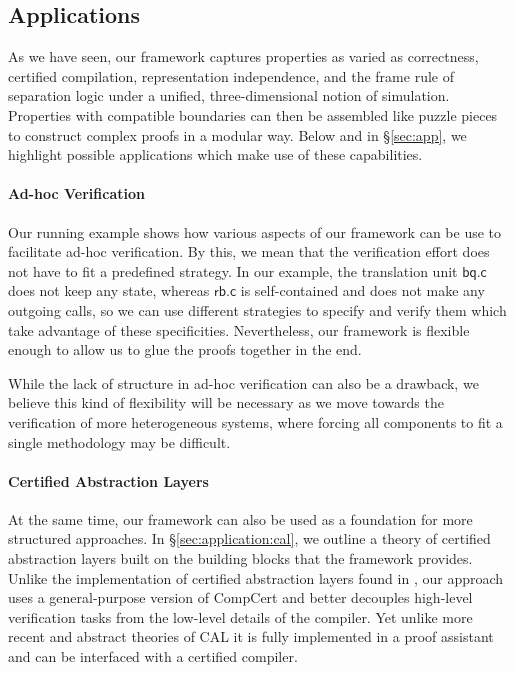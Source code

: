 \documentclass[acmsmall,screen,review,anonymous]{acmart}
\newcommand{\kw}[1]{\ensuremath{ \mathsf{#1} }}
\begin{document}
\subsection{Applications} \label{sec:overview:app} %

As we have seen,
our framework captures
properties as varied as
correctness,
certified compilation,
representation independence, and
the frame rule of separation logic
under a unified, three-dimensional notion of simulation.
Properties with compatible boundaries
can then be assembled like puzzle pieces
to construct complex proofs in a modular way.
Below and in \S\ref{sec:app},
we highlight possible applications
which make use of these capabilities.

\paragraph{Ad-hoc Verification} %

Our running example shows how
various aspects of our framework
can be use to facilitate ad-hoc verification.
By this,
we mean that the verification effort does not have to fit
a predefined strategy.
In our example,
the translation unit $\kw{bq.c}$ does not keep any state,
whereas $\kw{rb.c}$ is self-contained and
does not make any outgoing calls,
so we can use different strategies to specify and verify them
which take advantage of these specificities.
Nevertheless,
our framework is flexible enough to allow us
to glue the proofs together in the end.

While the lack of structure in ad-hoc verification
can also be a drawback,
we believe this kind of flexibility will be necessary
as we move towards the verification of more heterogeneous systems,
where forcing all components to fit a single methodology may be difficult.


\paragraph{Certified Abstraction Layers} %

At the same time,
our framework can also be used as a foundation
for more structured approaches.
In \S\ref{sec:application:cal},
we outline a theory of certified abstraction layers
built on the building blocks that the framework provides.
Unlike
the implementation of certified abstraction layers
found in \citet{popl15},
our approach uses a general-purpose version of CompCert
and better decouples high-level verification tasks
from the low-level details of the compiler.
Yet unlike more recent and abstract theories of CAL
\citep{rbgs-cal,popl22}
it is fully implemented in a proof assistant
and can be interfaced with a certified compiler.
\end{document}
